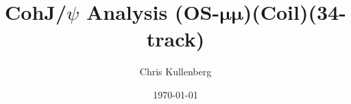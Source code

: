 \title{CohJ/$\psi$ Analysis (\textbf{OS}-$\boldsymbol{\mu\mu}$)(\textbf{Coil})(\textbf{34-track})}
\author{Chris Kullenberg}
\date{\today}
